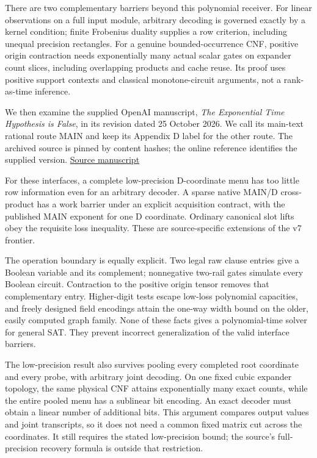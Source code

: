 \documentclass[
  11pt,
]{article}
\begin{document}
There are two complementary barriers beyond this polynomial receiver.
For linear observations on a full input module, arbitrary decoding is
governed exactly by a kernel condition; finite Frobenius duality
supplies a row criterion, including unequal precision rectangles. For a
genuine bounded-occurrence CNF, positive origin contraction needs
exponentially many actual scalar gates on expander count slices,
including overlapping products and cache reuse. Its proof uses positive
support contexts and classical monotone-circuit arguments, not a
rank-as-time inference.

We then examine the supplied OpenAI manuscript, \emph{The Exponential
Time Hypothesis is False}, in its revision dated 25 October 2026. We
call its main-text rational route MAIN and keep its Appendix D label for
the other route. The archived source is pinned by content hashes; the
online reference identifies the supplied version.
\href{https://github.com/openai/math/tree/main/preprints/The-Exponential-Time-Hypothesis-is-False-October-25-2026}{Source
manuscript}

For these interfaces, a complete low-precision D-coordinate menu has too
little row information even for an arbitrary decoder. A sparse native
MAIN/D cross-product has a work barrier under an explicit acquisition
contract, with the published MAIN exponent for one D coordinate.
Ordinary canonical slot lifts obey the requisite loss inequality. These
are source-specific extensions of the v7 frontier.

The operation boundary is equally explicit. Two legal raw clause entries
give a Boolean variable and its complement; nonnegative two-rail gates
simulate every Boolean circuit. Contraction to the positive origin
tensor removes that complementary entry. Higher-digit tests escape
low-loss polynomial capacities, and freely designed field encodings
attain the one-way width bound on the older, easily computed graph
family. None of these facts gives a polynomial-time solver for general
SAT. They prevent incorrect generalization of the valid interface
barriers.

The low-precision result also survives pooling every completed root
coordinate and every probe, with arbitrary joint decoding. On one fixed
cubic expander topology, the same physical CNF attains exponentially
many exact counts, while the entire pooled menu has a sublinear bit
encoding. An exact decoder must obtain a linear number of additional
bits. This argument compares output values and joint transcripts, so it
does not need a common fixed matrix cut across the coordinates. It still
requires the stated low-precision bound; the source's full-precision
recovery formula is outside that restriction.
\end{document}
